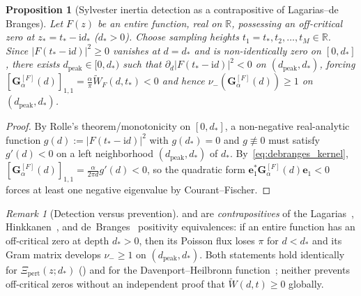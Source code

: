 \documentclass[11pt,reqno]{amsart}
\theoremstyle{plain}
\newtheorem{proposition}[theorem]{Proposition}
\theoremstyle{definition}
\theoremstyle{remark}
\newtheorem{remark}[theorem]{Remark}
\numberwithin{equation}{section}
\newcommand{\ii}{\mathrm{i}}
\begin{document}
\begin{proposition}[Sylvester inertia detection as a contrapositive of Lagarias--de Branges]\label{prop:gram_detection}
Let $F(z)$ be an entire function, real on $\mathbb{R}$, possessing an off-critical zero at $z_* = t_* - \ii d_*$ ($d_* > 0$). Choose sampling heights $t_1 = t_*, t_2, \dots, t_M \in \mathbb{R}$. Since $\lvert F(t_* - \ii d)\rvert^2 \ge 0$ vanishes at $d = d_*$ and is non-identically zero on $[0, d_*]$, there exists $d_{\mathrm{peak}} \in [0, d_*)$ such that $\partial_d\lvert F(t_* - \ii d)\rvert^2 < 0$ on $(d_{\mathrm{peak}}, d_*)$, forcing $[\mathbf{G}_\alpha^{[F]}(d)]_{1,1} = \frac{\alpha}{\pi}\widetilde{W}_F(d, t_*) < 0$ and hence $\nu_-(\mathbf{G}_\alpha^{[F]}(d)) \ge 1$ on $(d_{\mathrm{peak}}, d_*)$.
\end{proposition}

\begin{proof}
By Rolle's theorem/monotonicity on $[0, d_*]$, a non-negative real-analytic function $g(d) := \lvert F(t_* - \ii d)\rvert^2$ with $g(d_*) = 0$ and $g \not\equiv 0$ must satisfy $g'(d) < 0$ on a left neighborhood $(d_{\mathrm{peak}}, d_*)$ of $d_*$. By~\eqref{eq:debranges_kernel}, $[\mathbf{G}_\alpha^{[F]}(d)]_{1,1} = \frac{\alpha}{2\pi d}g'(d) < 0$, so the quadratic form $\mathbf{e}_1^*\mathbf{G}_\alpha^{[F]}(d)\mathbf{e}_1 < 0$ forces at least one negative eigenvalue by Courant--Fischer.
\end{proof}

\begin{remark}[Detection versus prevention]\label{rem:detection_only}
 and  are \emph{contrapositives} of the Lagarias~\cite{lagarias1999}, Hinkkanen~\cite{hinkkanen1997}, and de~Branges~\cite{debranges1968} positivity equivalences: if an entire function has an off-critical zero at depth $d_* > 0$, then its Poisson flux loses $\pi$ for $d < d_*$ and its Gram matrix develops $\nu_- \ge 1$ on $(d_{\mathrm{peak}}, d_*)$. Both statements hold identically for $\Xi_{\mathrm{pert}}(z; d_*)$ () and for the Davenport--Heilbronn function~\cite{davenportheilbronn1936}; neither prevents off-critical zeros without an independent proof that $\widetilde{W}(d,t) \ge 0$ globally.
\end{remark}
\end{document}
